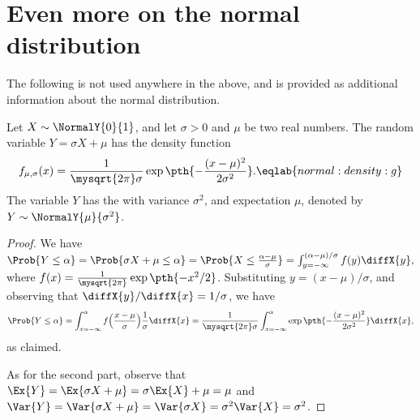 \section{Even more on the normal distribution}

The following is not used anywhere in the above, and is provided as
additional information about the normal distribution.

\begin{lemma}
    Let $X \sim \NormalY{0}{1}$, and let $\sigma > 0$ and $\mu$ be two
    real numbers. The random variable $Y = \sigma X + \mu$ has the
    density function
    \begin{equation}
        f_{\mu,\sigma}(x) = \frac{1}{\mysqrt{2\pi} \sigma} \exp\pth{
           -\frac{(x-\mu)^2}{2\sigma^2}}.
        \eqlab{normal:density:g}
    \end{equation}
    The variable $Y$ has the  with variance
    $\sigma^2$, and expectation $\mu$, denoted by
    $Y \sim \NormalY{\mu}{\sigma^2}$.
\end{lemma}
\begin{proof}
    We have
    \begin{math}
        \Prob{Y \leq \alpha}%
        =%
        \Prob{\sigma X + \mu \leq \alpha}%
        =%
        \Prob{ X \leq \frac{\alpha-\mu}{\sigma}}%
        =%
        \int_{y=-\infty}^{(\alpha-\mu)/{\sigma}} f(y) \diffX{y},
    \end{math}
    where $f(x) = \frac{1}{\mysqrt{2\pi}} \exp \pth{ -x^2/2}$.
    Substituting $y= (x - \mu)/\sigma$, and observing that
    $\diffX{y}/\diffX{x} = 1/\sigma$, we have
    \begin{equation*}
        \Prob{Y \leq \alpha}%
        =%
        \int_{x=-\infty}^{\alpha} f\Bigl( \frac{x-\mu}{\sigma} \Bigr)
        \frac{1}{\sigma} \diffX{x}%
        =%
        \frac{1}{\mysqrt{2\pi} \sigma}
        \int_{x=-\infty}^{\alpha} 
        \exp \pth{ -\frac{(x-\mu)^2}{2\sigma^2}} \diffX{x},
    \end{equation*}
    as claimed.

    As for the second part, observe that
    $\Ex{Y} = \Ex{\sigma X + \mu } = \sigma\Ex{X} + \mu = \mu$ and
    $\Var{Y} = \Var{\sigma X + \mu } = \Var{\sigma X } = \sigma^2
    \Var{X} = \sigma^2$.
\end{proof}



